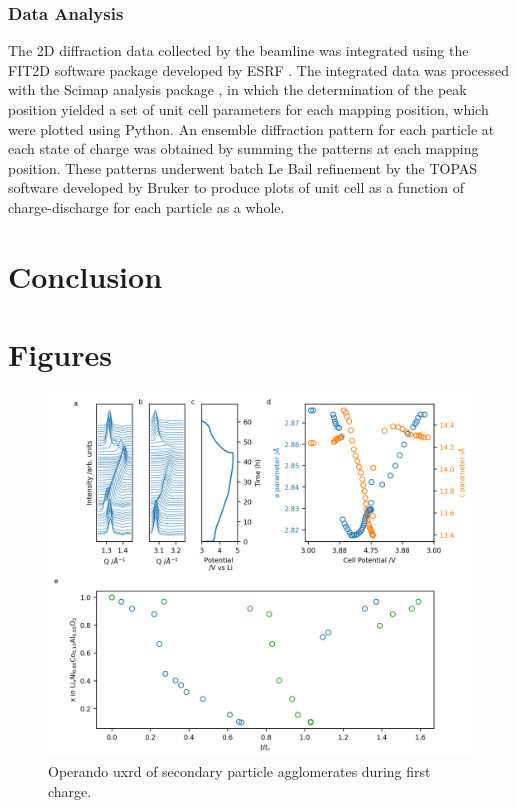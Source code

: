 \documentclass{article}
\begin{document}
\subsubsection{Data Analysis}
The 2D diffraction data collected by the beamline was integrated using
the FIT2D software package developed by ESRF \cite{Hammersley1996,
  Hammersley1997}. The integrated data was processed with the Scimap
analysis package \cite{Wolfman2015}, in which the determination of the
peak position yielded a set of unit cell parameters for each mapping
position, which were plotted using Python. An ensemble diffraction
pattern for each particle at each state of charge was obtained by
summing the patterns at each mapping position. These patterns
underwent batch Le Bail refinement by the TOPAS software developed by
Bruker to produce plots of unit cell as a function of charge-discharge
for each particle as a whole.


\section{Conclusion}

\section*{Figures}

\begin{figure}
  \includegraphics{figures/NCA_xrd.png}
  \caption{Operando \gls{uxrd} of \nca{} secondary particle
    agglomerates during first charge. }
\end{figure}
\end{document}

